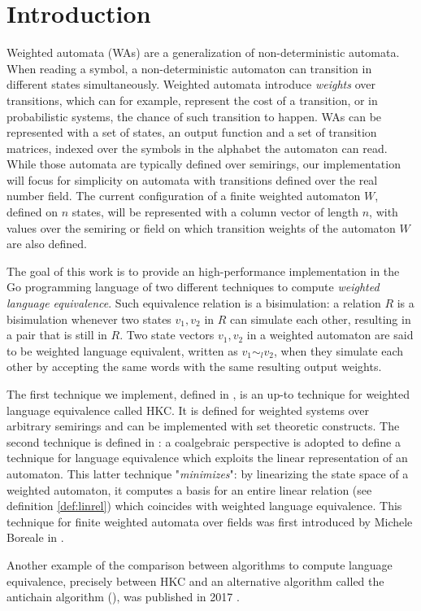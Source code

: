 \section{Introduction}
\label{sec:intro}

Weighted automata (WAs) are a generalization of non-deterministic automata.
When reading a symbol, a non-deterministic automaton 
can transition in different states simultaneously. Weighted automata
introduce \textit{weights} over transitions, which can for example, 
represent the cost of a transition, 
or in probabilistic systems, the chance of such transition to happen.
WAs can be represented with a set of states, an output function and
a set of transition matrices, indexed over the symbols in the alphabet
the automaton can read. While those automata are typically defined over semirings,
our implementation will focus for simplicity on automata with 
transitions defined over the real number field. 
The current configuration of a finite weighted automaton $W$,
defined on $n$ states, will be represented with a column vector of length
$n$, with values over the semiring or field on which transition weights of the
automaton $W$ are also defined. 

The goal of this work is to provide an high-performance implementation 
in the Go programming language of two different techniques 
to compute \textit{weighted language equivalence}.
Such equivalence relation is a bisimulation:
a relation $R$ is a bisimulation whenever two states $v_1, v_2$ in $R$ 
can simulate each other, resulting in a pair that is still in $R$.
Two state vectors $v_1, v_2$ in a weighted automaton are said to be 
weighted language equivalent, written as $v_1 \sim_l v_2$, when 
they simulate each other by accepting the same words with the same resulting output weights. 

The first technique we implement, 
defined in \cite{DBLP:journals/corr/Bonchi0K17}, is an up-to technique
for weighted language equivalence called HKC. It is defined for
weighted systems over arbitrary semirings and can be implemented with 
set theoretic constructs. The second technique is defined in \cite{BONCHI201277}:
a coalgebraic perspective is adopted to define a technique for language equivalence 
which exploits the linear representation of an automaton. 
This latter technique "\textit{minimizes}": by linearizing the state space of a
weighted automaton, 
it computes a basis for an entire linear relation (see definition \ref{def:linrel})
which coincides
with weighted language equivalence.
This technique for finite weighted automata over fields was first 
introduced by Michele Boreale in \cite{boreale2009weighted}.

Another example of the comparison between algorithms to compute 
language equivalence, precisely between HKC and an alternative
algorithm called the antichain algorithm (\cite{de2006antichains}),
was published in 2017 \cite{fu2017equivalence}.
